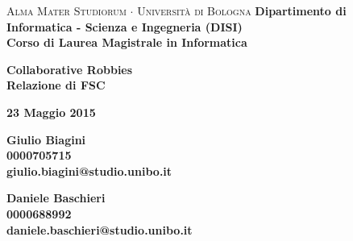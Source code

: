 \begin{list}{}{
  \setlength{\topsep}{20pt}
  \setlength{\leftmargin}{-40pt}%
  \setlength{\rightmargin}{-80pt}%
  \setlength{\listparindent}{0pt}%
  \setlength{\itemindent}{0pt}%
  \setlength{\parsep}{0pt}%
 }%
\item[]
\thispagestyle{empty}

\begin{center}
{{\center \fontsize{17.4}{60}\selectfont \textsc{Alma Mater Studiorum $\cdot$ Università di Bologna}}}
\noindent\makebox[\linewidth]{\rule[0.1cm]{15.8cm}{0.1mm}}
\noindent\makebox[\linewidth]{\rule[0.5cm]{15.8cm}{0.6mm}}
{\small{\bf Dipartimento di Informatica - Scienza e Ingegneria (DISI)\\
Corso di Laurea Magistrale in Informatica}}

\end{center}
\vspace{40mm}
\begin{center}
{\LARGE{\bf Collaborative Robbies}}\\
\vspace{3mm} {\large{\bf Relazione di FSC}}
\end{center}
\vspace{20mm}
\begin{center}
{\large{\bf 23 Maggio 2015}}
\end{center}
\vspace{50mm}
\par
\noindent
\begin{minipage}[t]{0.54\textwidth}\raggedright
{\large{\bf Giulio Biagini\\
0000705715\\
giulio.biagini@studio.unibo.it\vspace{\baselineskip}}}\\
\end{minipage}
\hfill
\begin{minipage}[t]{0.54\textwidth}\raggedleft
{\large{\bf Daniele Baschieri\\
0000688992\\
daniele.baschieri@studio.unibo.it}}
\end{minipage}

\end{list}
